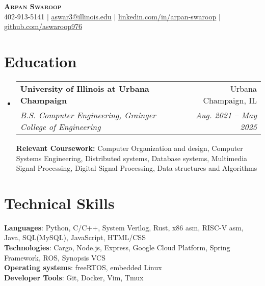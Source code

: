 \documentclass[letterpaper,10pt]{article}
\makeatletter
\newcommand{\resumeSubheading}[4]{
  \vspace{-2pt}\item
    \begin{tabular*}{0.97\textwidth}[t]{l@{\extracolsep{\fill}}r}
      \textbf{#1} & #2 \\
      \textit{\small#3} & \textit{\small #4} \\
    \end{tabular*}\vspace{-7pt}
}
\newcommand{\resumeSubHeadingListStart}{\begin{itemize}[leftmargin=0.15in, label={}, itemsep=0pt]}
\newcommand{\resumeSubHeadingListEnd}{\end{itemize}}
\makeatother
\begin{document}

\begin{center}
  \textbf{\Huge \scshape Arpan Swaroop} \\ \vspace{1pt}
  \small 402-913-5141 $|$ \href{mailto:aswar3@illinois.edu}{\underline{aswar3@illinois.edu}} $|$
  \href{https://www.linkedin.com/in/arpan-swaroop-008b04256/}{\underline{linkedin.com/in/arpan-swaroop}} $|$
  \href{https://github.com/aswaroop976}{\underline{github.com/aswaroop976}}
\end{center}


\section{Education}
\resumeSubHeadingListStart
\resumeSubheading
{University of Illinois at Urbana Champaign}{Urbana Champaign, IL}
{B.S. Computer Engineering, Grainger College of Engineering}{Aug. 2021 -- May 2025}
\newline
\newline
\textbf{Relevant Coursework: }Computer Organization and design, Computer Systems Engineering, Distributed systems, Database systems, Multimedia Signal Processing, Digital Signal Processing, Data structures and Algorithms
\resumeSubHeadingListEnd
\section{Technical Skills}
\begin{itemize}[leftmargin=0.15in, label={}]
  \small{\item{
                \textbf{Languages}{: Python, C/C++, System Verilog, Rust, x86 asm, RISC-V asm, Java, SQL(MySQL), JavaScript, HTML/CSS} \\
                \textbf{Technologies}{: Cargo, Node.js, Express, Google Cloud Platform, Spring Framework, ROS, Synopsis VCS} \\
                \textbf{Operating systems}{: freeRTOS, embedded Linux} \\
                \textbf{Developer Tools}{: Git, Docker, Vim, Tmux} \\
          }}
\end{itemize}
\end{document}
